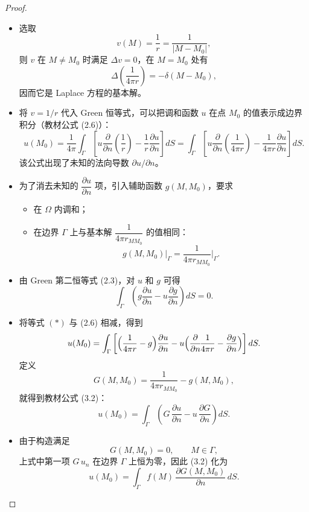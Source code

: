 \begin{note}[式 (2.7) 的来源与意义]
\begin{proof}
\begin{itemize}
  \item 选取
  \[
    v(M)=\frac{1}{r}=\frac{1}{|M-M_0|},
  \]
  则 $v$ 在 $M\neq M_0$ 时满足 $\Delta v=0$，在 $M=M_0$ 处有
  \[
    \Delta\!\left(\frac{1}{4\pi r}\right)=-\delta(M-M_0),
  \]
  因而它是 Laplace 方程的基本解。

  \item 将 $v=1/r$ 代入 Green 恒等式，可以把调和函数 $u$ 在点 $M_0$ 的值表示成边界积分（教材公式 (2.6)）：
  \[
    u(M_0)
    = \frac{1}{4\pi}\int_\Gamma
    \left[
      u\frac{\partial}{\partial n}\!\left(\frac{1}{r}\right)
      - \frac{1}{r}\frac{\partial u}{\partial n}
    \right] dS
    =
    \int_\Gamma
    \left[
      u\frac{\partial}{\partial n}\!\left(\frac{1}{4\pi r}\right)
      - \frac{1}{4\pi r}\frac{\partial u}{\partial n}
    \right] dS .
  \tag{2.6}
  \]
  该公式出现了未知的法向导数 $\partial u/\partial n$。

  \item 为了消去未知的 $\dfrac{\partial u}{\partial n}$ 项，引入辅助函数 $g(M,M_0)$，要求  
  \begin{itemize}
    \item 在 $\Omega$ 内调和；
    \item 在边界 $\Gamma$ 上与基本解 $\dfrac{1}{4\pi r_{MM_0}}$ 的值相同：
  \[
    g(M,M_0)\big|_{\Gamma}
    =\frac{1}{4\pi r_{MM_0}}\Big|_{\Gamma}.
  \tag{3.1}
  \]
  \end{itemize}

  \item 由 Green 第二恒等式 (2.3)，对 $u$ 和 $g$ 可得
  \[
    \int_\Gamma\left(g\frac{\partial u}{\partial n} - u\frac{\partial g}{\partial n}\right)dS = 0 .
  \tag{*}
  \]

  \item 将等式 \((*)\) 与 (2.6) 相减，得到
  \[
    u(M_0)
    =
    \int_\Gamma
    \left[
      \Bigl(\frac{1}{4\pi r}-g\Bigr)\frac{\partial u}{\partial n}
      - u\Bigl(\frac{\partial}{\partial n}\!\frac{1}{4\pi r}
               -\frac{\partial g}{\partial n}\Bigr)
    \right] dS .
  \]
  定义
  \[
    G(M,M_0)=\frac{1}{4\pi r_{MM_0}}-g(M,M_0),
  \]
  就得到教材公式 (3.2)：
  \[
    u(M_0)
    =
    \int_\Gamma
    \left(
      G\,\frac{\partial u}{\partial n}
      - u\,\frac{\partial G}{\partial n}
    \right) dS .
  \tag{3.2}
  \]

  \item 由于构造满足  
  \[
    G(M,M_0)=0,\qquad M\in\Gamma ,
  \]
  上式中第一项 $G\,u_n$ 在边界 $\Gamma$ 上恒为零，因此 (3.2) 化为
  \[
    u(M_0)
    =\int_\Gamma f(M)\,\frac{\partial G(M,M_0)}{\partial n}\, dS .
  \]


\end{itemize}
\end{proof}
\end{note}
